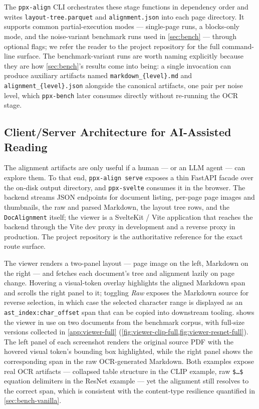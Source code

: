 \documentclass{article}
\theoremstyle{definition}
\begin{document}
The \texttt{ppx-align} CLI orchestrates these stage functions in
dependency order and writes \texttt{layout-tree.parquet} and
\texttt{alignment.json} into each page directory.  It supports
common partial-execution modes --- single-page runs, a
blocks-only mode, and the noise-variant benchmark runs used in
\cref{sec:bench} --- through optional flags; we refer the reader to
the project repository for the full command-line surface.  The
benchmark-variant runs are worth naming explicitly because they are
how \cref{sec:bench}'s results come into being: a single invocation
can produce auxiliary artifacts named \texttt{markdown\_\{level\}.md}
and \texttt{alignment\_\{level\}.json} alongside the canonical
artifacts, one pair per noise level, which \texttt{ppx-bench}
later consumes directly without re-running the OCR stage.

\subsection{Client/Server Architecture for AI-Assisted Reading}
\label{sec:clientserver}

The alignment artifacts are only useful if a human --- or an LLM
agent --- can explore them.  To that end, \texttt{ppx-align serve}
exposes a thin FastAPI facade over the on-disk output directory,
and \texttt{ppx-svelte} consumes it in the browser.  The backend
streams JSON endpoints for document listing, per-page page images
and thumbnails, the raw and parsed Markdown, the layout tree rows,
and the \texttt{DocAlignment} itself; the viewer is a SvelteKit /
Vite application that reaches the backend through the Vite dev
proxy in development and a reverse proxy in production.  The
project repository is the authoritative reference for the exact
route surface.

The viewer renders a two-panel layout --- page image on the left,
Markdown on the right --- and fetches each document's tree and
alignment lazily on page change.  Hovering a visual-token overlay
highlights the aligned Markdown span and scrolls the right panel to
it; toggling \emph{Raw} exposes the Markdown source for reverse
selection, in which case the selected character range is displayed
as an \texttt{ast\_index:char\_offset} span that can be copied into
downstream tooling.   shows the viewer in
use on two documents from the benchmark corpus, with full-size
versions collected in \cref{app:viewer-full}
(\cref{fig:viewer-clip-full,fig:viewer-resnet-full}).  The left panel
of each screenshot renders the original source PDF with the hovered
visual token's bounding box highlighted, while the right panel shows
the corresponding span in the raw OCR-generated Markdown.  Both
examples expose real OCR artifacts --- collapsed table structure in
the CLIP example, raw \texttt{\$\ldots\$} equation delimiters in the
ResNet example --- yet the alignment still resolves to the correct
span, which is consistent with the content-type resilience
quantified in \cref{sec:bench-vanilla}.
\end{document}
